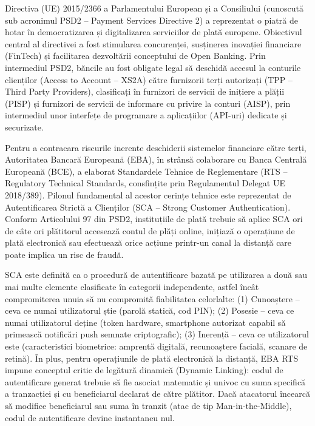 \documentclass[
]{article}
\begin{document}
Directiva (UE) 2015/2366 a Parlamentului European și a Consiliului
(cunoscută sub acronimul PSD2 -- Payment Services Directive 2) a
reprezentat o piatră de hotar în democratizarea și digitalizarea
serviciilor de plată europene. Obiectivul central al directivei a fost
stimularea concurenței, susținerea inovației financiare (FinTech) și
facilitarea dezvoltării conceptului de Open Banking. Prin intermediul
PSD2, băncile au fost obligate legal să deschidă accesul la conturile
clienților (Access to Account -- XS2A) către furnizorii terți autorizați
(TPP -- Third Party Providers), clasificați în furnizori de servicii de
inițiere a plății (PISP) și furnizori de servicii de informare cu
privire la conturi (AISP), prin intermediul unor interfețe de programare
a aplicațiilor (API-uri) dedicate și securizate.

Pentru a contracara riscurile inerente deschiderii sistemelor financiare
către terți, Autoritatea Bancară Europeană (EBA), în strânsă colaborare
cu Banca Centrală Europeană (BCE), a elaborat Standardele Tehnice de
Reglementare (RTS -- Regulatory Technical Standards, consfințite prin
Regulamentul Delegat UE 2018/389). Pilonul fundamental al acestor
cerințe tehnice este reprezentat de Autentificarea Strictă a Clienților
(SCA -- Strong Customer Authentication). Conform Articolului 97 din
PSD2, instituțiile de plată trebuie să aplice SCA ori de câte ori
plătitorul accesează contul de plăți online, inițiază o operațiune de
plată electronică sau efectuează orice acțiune printr-un canal la
distanță care poate implica un risc de fraudă.

SCA este definită ca o procedură de autentificare bazată pe utilizarea a
două sau mai multe elemente clasificate în categorii independente,
astfel încât compromiterea unuia să nu compromită fiabilitatea
celorlalte: (1) Cunoaștere -- ceva ce numai utilizatorul știe (parolă
statică, cod PIN); (2) Posesie -- ceva ce numai utilizatorul deține
(token hardware, smartphone autorizat capabil să primească notificări
push semnate criptografic); (3) Inerență -- ceva ce utilizatorul este
(caracteristici biometrice: amprentă digitală, recunoaștere facială,
scanare de retină). În plus, pentru operațiunile de plată electronică la
distanță, EBA RTS impune conceptul critic de legătură dinamică (Dynamic
Linking): codul de autentificare generat trebuie să fie asociat
matematic și univoc cu suma specifică a tranzacției și cu beneficiarul
declarat de către plătitor. Dacă atacatorul încearcă să modifice
beneficiarul sau suma în tranzit (atac de tip Man-in-the-Middle), codul
de autentificare devine instantaneu nul.
\end{document}
